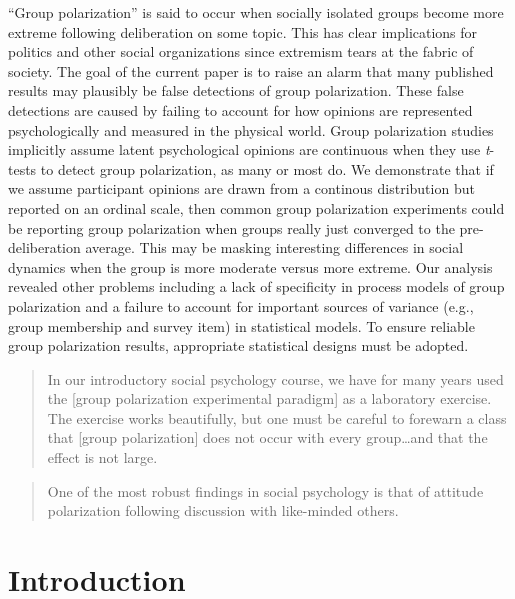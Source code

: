 
  ``Group polarization'' is said to occur when socially isolated groups become more
  extreme following deliberation on some topic. This has clear implications for
  politics and other social organizations since extremism tears at the fabric
  of society. The goal of the current paper is to raise an alarm that
  many published results may plausibly be false detections of group polarization.
  These false detections are 
  caused by failing to account for how opinions are represented psychologically
  and measured in the physical world. Group polarization studies implicitly assume latent psychological opinions are continuous
  when they use \emph{t}-tests to detect group polarization, as many or most do.
  We demonstrate that if we assume 
  participant opinions are drawn from a continous distribution but reported
  on an ordinal scale, then common group polarization experiments could be
  reporting group polarization when groups really just converged to the 
  pre-deliberation average. This may be masking interesting differences 
  in social dynamics when the group is more moderate versus more extreme.
  Our analysis revealed other problems including
  a lack of specificity in process models of group polarization and a failure
  to account for important sources of variance (e.g., group membership 
  and survey item) in statistical models. To ensure reliable group polarization
  results, appropriate statistical designs must be adopted.

\newpage

\begin{quote}
In our introductory social psychology course, 
we have for many years used the [group polarization experimental paradigm] as
a laboratory exercise. The exercise works beautifully, but one must be
careful to forewarn a class that [group polarization] does not occur with every 
group\ldots and that the effect is not large. 
\par\raggedleft\cite[p. 205]{Brown1986}
\end{quote}

\begin{quote}
One of the most robust findings in social psychology is that of attitude polarization 
following discussion with like-minded others.
\par\raggedleft\cite[p. 267]{Cooper2001}
\end{quote}


\section{Introduction}
\label{sec:intro}

